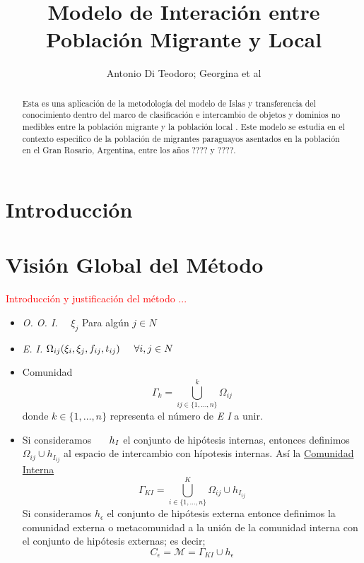 \documentclass[]{article}
\title{Modelo de Interaci\'on entre Poblaci\'on Migrante y Local}
\author{Antonio Di Teodoro; Georgina et al}
\begin{document}
\maketitle

\begin{abstract}
Esta es una aplicaci\'on de la metodolog\'ia del modelo de Islas y transferencia del conocimiento dentro del marco de clasificaci\'on e intercambio de objetos y dominios no medibles entre la población migrante y la poblaci\'on local . Este modelo se estudia en el contexto especifico de la poblaci\'on  de migrantes paraguayos asentados en la poblaci\'on en el Gran Rosario, Argentina, entre los años ???? y ????.
\end{abstract}

\section{Introducci\'on}

\section{Visi\'on Global del M\'etodo}

\textcolor{red}{Introducci\'on y justificaci\'on del m\'etodo ...}

\begin{itemize}
	\item \emph{O.  O.   I.}   \ \  $\xi_{j}$ Para alg\'un   ${j \in N}$
	\item \emph{E.  I.}  \hspace{1cm} \begin{math} \Omega_{i j} ( \xi_{i}, \xi_{j}, f_{i j}, t_{i j}) \hspace{0.5cm} \forall i , j \in N \end{math}
	\item Comunidad
	\begin{equation}
	\Gamma_k = \bigcup^{k}_{i j \in \{1,\ldots,n\}}\Omega_{i j}
	\end{equation}
	donde  $ k \in \{1,\ldots,n\}$ representa el n\'umero de \emph{E I} a unir.
	\item Si  consideramos $ \hspace{0.5cm} h_I$ el conjunto de hip\'otesis internas, entonces definimos $\Omega_{i j} \cup h_{I_{i j}}$ al espacio de intercambio con h\'ipotesis internas. As\'i la \underline{Comunidad Interna}
	\begin{equation}
	\Gamma_{KI}=\bigcup^{K}_{i \in \{1,\ldots,n\}} \Omega_{i j}\cup h_{I_{i j}}
	\end{equation}
	Si consideramos $h_\epsilon$ el conjunto de hip\'otesis externa entonce definimos  la comunidad  externa o metacomunidad a la unión de la comunidad interna con el conjunto de hip\'otesis externas; es decir;
	\begin{equation}
	C_\epsilon =\mathcal{M} = \Gamma_{KI}\cup h_\epsilon
	\end{equation}
	
\end{itemize}
\end{document}
